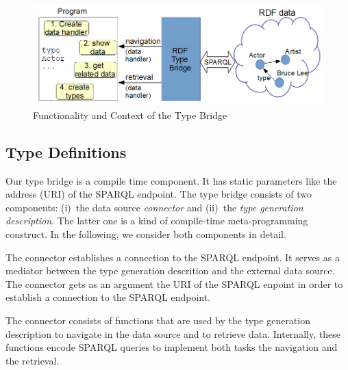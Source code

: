 \documentclass{llncs} %
\newcommand{\ggr}[1]{\textcolor{magenta}{comment Gerd: \textit{#1}}}
\begin{document}
\begin{figure}
	\centering
		\includegraphics[width=0.98\linewidth]{./figs/context.png}
	\caption{Functionality and Context of the Type Bridge}
	\label{fig:context}
\end{figure}



\subsection{Type Definitions}

Our type bridge is a compile time component. It has static parameters like
the address (URI) of the SPARQL endpoint.
The type bridge consists of two components: (i)~the data source \emph{connector} and (ii)~the
\emph{type generation description}. The latter one is a kind of compile-time meta-programming construct.
In the following, we consider both components in detail.

The connector establishes a connection to the SPARQL endpoint. It serves as a mediator
between the type generation descrition and the external data source.
The connector gets as an argument the URI of the SPARQL enpoint
in order to establish a connection to the SPARQL endpoint.


The connector consists of functions that are used by the type generation description
to navigate in the data source and to retrieve data. Internally, these functions
encode SPARQL queries to implement both tasks the navigation and the retrieval.

%
%
%
\end{document}
